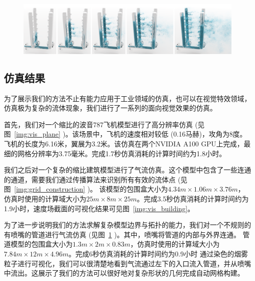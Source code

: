\begin{figure}[htb]
  \centering
    \includegraphics[width=0.99\columnwidth]{figures/vis_pipe.png}
  \label{img:vis_pipe}
\end{figure}

\subsection{仿真结果}
为了展示我们的方法不止有能力应用于工业领域的仿真，也可以在视觉特效领域，仿真极为复杂的流体现象，我们进行了一系列的面向视觉效果的仿真。

首先，我们对一个缩比的波音787飞机模型进行了高分辨率仿真 (见图~\ref{img:vis_plane} )。该场景中，飞机的速度相对较低 (0.16马赫)，攻角为8度。飞机的长度为6.16米，翼展为3.2米。该仿真在两个NVIDIA A100 GPU上完成，最细的网格分辨率为3.75毫米。完成1.7秒仿真消耗的计算时间约为1.8小时。

我们之后对一个复杂的缩比建筑模型进行了气流仿真。这个模型中包含了一些连通的通道，需要我们通过传播算法来识别所有有效的流体点 (见图~\ref{img:grid_construction} )。
该模型的包围盒大小为$4.34m\!\times\!1.06m\!\times\!3.76m$，仿真时使用的计算域大小为$25m\!\times\!8m\!\times\!25m$。完成3.5秒仿真消耗的计算时间约为1.9小时，速度场截面的可视化结果可见图~\ref{img:vis_building}。

为了进一步说明我们的方法求解复杂模型边界与拓扑的能力，我们对一个不规则的有喷嘴的管道进行气流仿真 (见图~\ref{img:vis_pipe} )。其中，喷嘴将管道的内部与外界连通。
管道模型的包围盒大小为$1.3m\!\times\!2m\!\times\!0.83m$，仿真时使用的计算域大小为$7.84m\!\times\!12m\!\times\!4.96m$。完成6秒仿真消耗的计算时间约为0.9小时
通过染色的烟雾粒子进行可视化，我们可以很清楚地看到气流通过左下的入口流入管道，并从喷嘴中流出。这展示了我们的方法可以很好地对复杂形状的几何完成自动网格构建。


